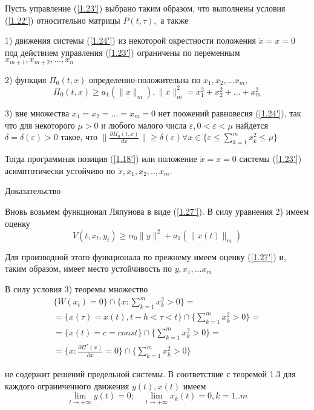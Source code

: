 \begin{theorem}\label{t-1.9}
Пусть управление (\ref{1.23'}) выбрано таким образом, что выполнены условия (\ref{1.22'}) относительно матрицы $P(t, \tau),$ а также 

1) движения системы (\ref{1.24'}) из некоторой окрестности положения $\dot x = x= 0$ под действием управления (\ref{1.23'}) ограничены по переменным $x_{m+1}, x_{m+2}, ... , x_n$ 

2) функция $\Pi_0 (t, x)$ определенно-положительна по $x_1, x_2, ... x_m$,
$$\Pi_0(t, x) \ge a_1 (\| x \|_m), \| x \|^2_m = x_1^2 + x_2^2 + ... + x_m^2$$

3) вне множества ${x_1 = x_2 = ... = x_m = 0}$ нет поожений равновесия (\ref{1.24'}), так что для некоторого $\mu > 0$ и любого малого числа  $\varepsilon, 0 < \varepsilon < \mu$ найдется $\delta = \delta(\varepsilon) > 0$ такое, что $\| \frac{\partial \Pi_0 (t, x)}{dx} \| \ge \delta(\varepsilon) \forall x \in \lbrace \varepsilon \le \sum_{k = 1}^{m} x_k^2 \le \mu \rbrace$

Тогда программная позиция (\ref{1.18'}) или положение $\dot x = x = 0$ системы (\ref{1.23'}) асимптотически устойчиво по $\dot x, x_1, x_2,.., x_m.$
\end{theorem}

Доказательство 

Вновь возьмем функционал Ляпунова в виде (\ref{1.27'}). В силу уравнения 2) имеем оценку
$$
V(t, x_t, y_t) \ge \alpha_0 \| y \| ^2 + a_1 (\| x(t) \|_m)
$$

Для производной этого функционала по прежнему имеем оценку (\ref{1.27'}) и, таким образом, имеет место устойчивость по $y, x_1, ... x_m$

В силу условия 3) теоремы множество 
$$
\begin{array}{c}
\displaystyle \lbrace W(x_t) = 0 \rbrace \cap \lbrace x : \sum_{k = 1}^{m} x_k^2 > 0 \rbrace =\\
\displaystyle = \lbrace x(\tau) = x(t), t - h < \tau < t \rbrace \cap \lbrace \sum_{k = 1}^{m} x_k^2 > 0 \rbrace =\\
\displaystyle = \lbrace x(t) = c = const \rbrace \cap \lbrace \sum_{k = 1}^{m} x_k^2 > 0 \rbrace =\\
\displaystyle = \lbrace x: \frac{\partial \Pi^{*} (x)}{\partial x} = 0 \rbrace \cap \lbrace \sum_{k = 1}^{m} x_k^2 > 0 \rbrace
\end{array}
$$

не содержит решений предельной системы. В соответствие с теоремой 1.3 для каждого ограниченного движения $y(t), x(t)$ имеем
$$\lim_{t \to + \infty} y(t) = 0; \quad \lim_{t \to + \infty} x_k (t) = 0, k = 1..m$$

